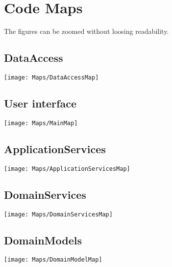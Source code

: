 \chapter{Code Maps}
\label{app:codemaps}
The figures can be zoomed without loosing readability.

\section{DataAccess}
\texttt{[image: Maps/DataAccessMap]}

\section{User interface}
\texttt{[image: Maps/MainMap]}

\section{ApplicationServices}
\texttt{[image: Maps/ApplicationServicesMap]}

\section{DomainServices}
\texttt{[image: Maps/DomainServicesMap]}

\section{DomainModels}
\texttt{[image: Maps/DomainModelMap]}

